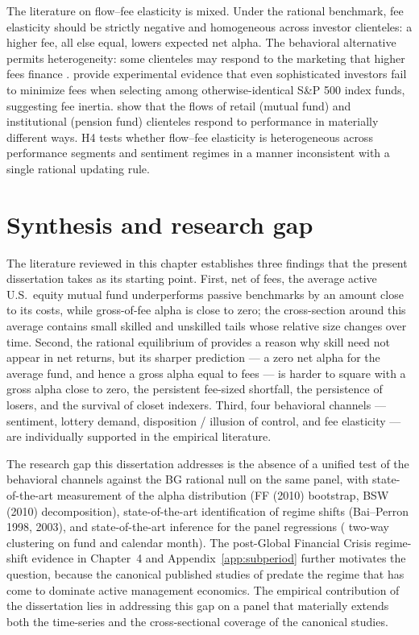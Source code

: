 \documentclass[12pt, oneside]{report}
\begin{document}
\noindent The literature on flow--fee elasticity is mixed. Under the
\textcite{BerkGreen2004} rational benchmark, fee elasticity should be
strictly negative and homogeneous across investor clienteles: a higher
fee, all else equal, lowers expected net alpha. The behavioral
alternative permits heterogeneity: some clienteles may respond to the
marketing that higher fees finance \parencite{SirriTufano1998}.
\textcite{ChoiLaibsonMadrian2010} provide experimental evidence that even
sophisticated investors fail to minimize fees when selecting among
otherwise-identical S\&P 500 index funds, suggesting fee inertia.
\textcite{DelGuercioTkac2002} show that the flows of retail (mutual fund)
and institutional (pension fund) clienteles respond to performance in
materially different ways. H4 tests
whether flow--fee elasticity is heterogeneous across performance
segments and sentiment regimes in a manner inconsistent with a single
rational updating rule.

\section{Synthesis and research gap}
\label{sec:synthesis}

\noindent The literature reviewed in this chapter establishes three
findings that the present dissertation takes as its starting point. First,
net of fees, the average active U.S.\ equity mutual fund underperforms
passive benchmarks by an amount close to its costs, while gross-of-fee
alpha is close to zero; the cross-section around this average contains
small skilled and unskilled tails whose relative size changes over time.
Second, the rational equilibrium of \textcite{BerkGreen2004} provides a
reason why skill need not appear in net returns, but its sharper
prediction --- a zero net alpha for the average fund, and hence a gross
alpha equal to fees --- is harder to square with a gross alpha close to
zero, the persistent fee-sized shortfall, the persistence of losers, and the
survival of closet indexers. Third, four behavioral channels --- sentiment,
lottery demand, disposition / illusion of control, and fee elasticity ---
are individually supported in the empirical literature.

The research gap this dissertation addresses is the absence of a unified
test of the behavioral channels against the BG rational null on the same
panel, with state-of-the-art measurement of the alpha distribution
(FF (2010) bootstrap, BSW (2010) decomposition), state-of-the-art
identification of regime shifts (Bai--Perron 1998, 2003), and
state-of-the-art inference for the panel regressions
(\textcite{Petersen2009} two-way clustering on fund and calendar month).
The post-Global Financial Crisis regime-shift evidence in Chapter~4 and
Appendix~\ref{app:subperiod} further motivates the question, because the canonical
published studies of \textcite{FamaFrench2010,BarrasScailletWermers2010}
predate the regime that has come to dominate active management economics.
The empirical contribution of the dissertation lies in addressing this
gap on a panel that materially extends both the time-series and the
cross-sectional coverage of the canonical studies.
\end{document}
